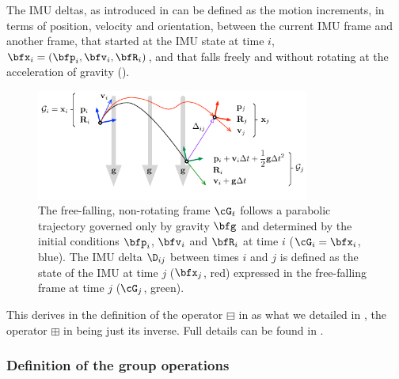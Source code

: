The IMU deltas, as introduced in \cite{lupton-09, forster2015imu} can be defined \cite{atchuthan-18-thesis} as the motion increments, in terms of position, velocity and orientation, between the current IMU frame and another frame, that started at the IMU state at time $i$, $\bfx_i=(\bfp_i,\bfv_i,\bfR_i)$, and that falls freely and without rotating at the acceleration of gravity ().

\begin{figure}[t]
\centering
\includegraphics[width=0.8\textwidth]{figures/fff}
\caption{The free-falling, non-rotating frame $\cG_t$ follows a parabolic trajectory governed only by gravity $\bfg$ and determined by the initial conditions $\bfp_i$, $\bfv_i$ and $\bfR_i$ at time $i$ ($\cG_i=\bfx_i$, blue). The IMU delta $\D_{ij}$ between times $i$ and $j$ is defined as the state of the IMU at time $j$ ($\bfx_j$, red) expressed in the free-falling frame at time $j$ ($\cG_j$, green).}
\label{fig:fff}
\end{figure}

This derives in the definition of the operator $\boxminus$ in  as what we detailed in , the operator $\boxplus$ in  being just its inverse.
Full details can be found in \cite[Section 3.4]{atchuthan-18-thesis}.


\subsubsection{Definition of the group operations}

